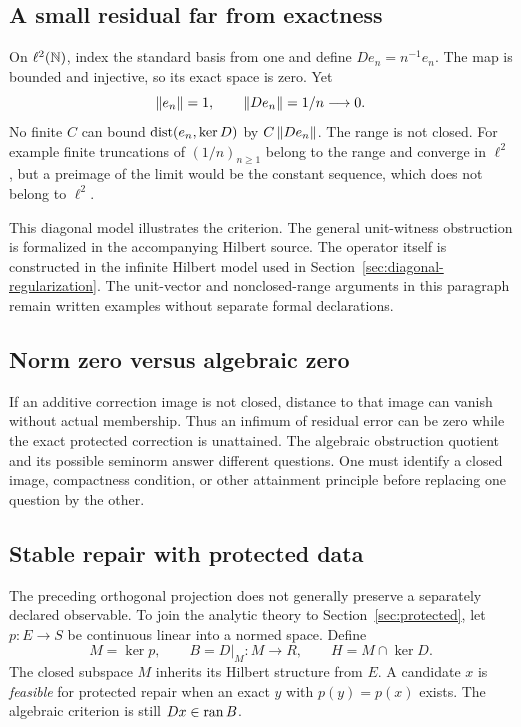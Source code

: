\subsection{A small residual far from exactness}
On \(\ell^2(\mathbb N)\), index the standard basis from one and define \(De_n=n^{-1}e_n\). The map is bounded and injective, so its exact space is zero. Yet
\[
 \left\lVert e_n\right\rVert=1,\qquad\left\lVert De_n\right\rVert=1/n\longrightarrow0.
\]
No finite \(C\) can bound \(\operatorname{dist}(e_n,\ker D)\) by \(C\left\lVert De_n\right\rVert\). The range is not closed. For example finite truncations of \((1/n)_{n\ge1}\) belong to the range and converge in \(\ell^2\), but a preimage of the limit would be the constant sequence, which does not belong to \(\ell^2\).

This diagonal model illustrates the criterion. The general unit-witness obstruction is formalized in the accompanying Hilbert source. The operator itself is constructed in the infinite Hilbert model used in Section~\ref{sec:diagonal-regularization}. The unit-vector and nonclosed-range arguments in this paragraph remain written examples without separate formal declarations.


\subsection{Norm zero versus algebraic zero}
If an additive correction image is not closed, distance to that image can vanish without actual membership. Thus an infimum of residual error can be zero while the exact protected correction is unattained. The algebraic obstruction quotient and its possible seminorm answer different questions. One must identify a closed image, compactness condition, or other attainment principle before replacing one question by the other.

\subsection{Stable repair with protected data}
The preceding orthogonal projection does not generally preserve a separately declared observable. To join the analytic theory to Section~\ref{sec:protected}, let \(p:E\to S\) be continuous linear into a normed space. Define
\[
 M=\ker p,\qquad B=D|_M:M\to R,\qquad H=M\cap\ker D.
\]
The closed subspace \(M\) inherits its Hilbert structure from \(E\). A candidate \(x\) is \emph{feasible} for protected repair when an exact \(y\) with \(p(y)=p(x)\) exists. The algebraic criterion is still \(Dx\in\operatorname{ran} B\).

